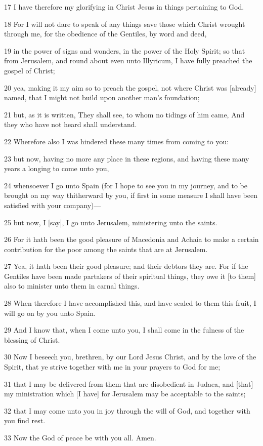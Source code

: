 \par 17 I have therefore my glorifying in Christ Jesus in things pertaining to God.
\par 18 For I will not dare to speak of any things save those which Christ wrought through me, for the obedience of the Gentiles, by word and deed,
\par 19 in the power of signs and wonders, in the power of the Holy Spirit; so that from Jerusalem, and round about even unto Illyricum, I have fully preached the gospel of Christ;
\par 20 yea, making it my aim so to preach the gospel, not where Christ was [already] named, that I might not build upon another man's foundation;
\par 21 but, as it is written, They shall see, to whom no tidings of him came, And they who have not heard shall understand.
\par 22 Wherefore also I was hindered these many times from coming to you:
\par 23 but now, having no more any place in these regions, and having these many years a longing to come unto you,
\par 24 whensoever I go unto Spain (for I hope to see you in my journey, and to be brought on my way thitherward by you, if first in some measure I shall have been satisfied with your company)—
\par 25 but now, I [say], I go unto Jerusalem, ministering unto the saints.
\par 26 For it hath been the good pleasure of Macedonia and Achaia to make a certain contribution for the poor among the saints that are at Jerusalem.
\par 27 Yea, it hath been their good pleasure; and their debtors they are. For if the Gentiles have been made partakers of their spiritual things, they owe it [to them] also to minister unto them in carnal things.
\par 28 When therefore I have accomplished this, and have sealed to them this fruit, I will go on by you unto Spain.
\par 29 And I know that, when I come unto you, I shall come in the fulness of the blessing of Christ.
\par 30 Now I beseech you, brethren, by our Lord Jesus Christ, and by the love of the Spirit, that ye strive together with me in your prayers to God for me;
\par 31 that I may be delivered from them that are disobedient in Judaea, and [that] my ministration which [I have] for Jerusalem may be acceptable to the saints;
\par 32 that I may come unto you in joy through the will of God, and together with you find rest.
\par 33 Now the God of peace be with you all. Amen.

